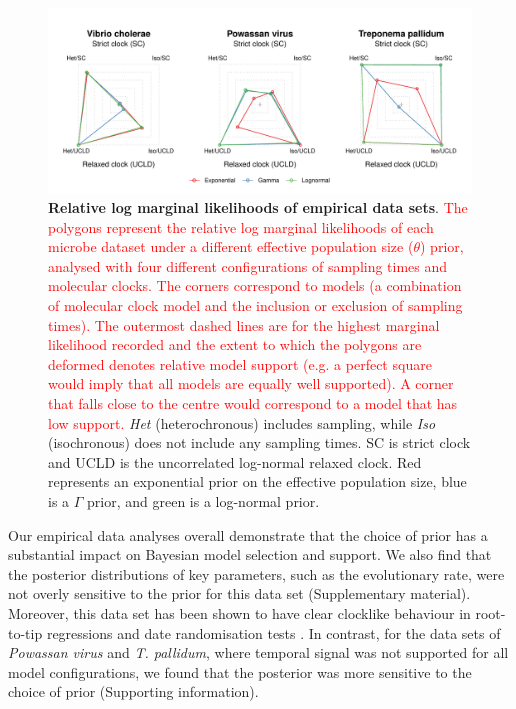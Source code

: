 \documentclass[10pt,letterpaper]{article}
\begin{document}
\begin{figure}
	\begin{center}
		\includegraphics[width=14cm]{sandbox_figures/polygon_plot.pdf}\newline
		\vspace{-0.5cm}
		\caption{\textbf{Relative log marginal likelihoods of empirical data sets}. \textcolor{red}{The polygons represent the relative log marginal likelihoods of each microbe dataset under a different effective population size ($\theta$) prior, analysed with four different configurations of sampling times and molecular clocks. The corners correspond to models (a combination of molecular clock model and the inclusion or exclusion of sampling times). The outermost dashed lines are for the highest marginal likelihood recorded and the extent to which the polygons are deformed denotes relative model support (e.g. a perfect square would imply that all models are equally well supported). A corner that falls close to the centre would correspond to a model that has low support.} \textit{Het} (heterochronous) includes sampling, while \textit{Iso} (isochronous) does not include any sampling times. SC is strict clock and UCLD is the uncorrelated log-normal relaxed clock. Red represents an exponential prior on the effective population size, blue is a $\Gamma$ prior, and green is a log-normal prior.}
		\label{figure:polygon_plots}
	\end{center}
\end{figure}

Our empirical data analyses overall demonstrate that the choice of prior has a substantial impact on Bayesian model selection and support. We also find that the posterior distributions of key parameters, such as the evolutionary rate, were not overly sensitive to the prior for this data set (Supplementary material). Moreover, this data set has been shown to have clear clocklike behaviour in root-to-tip regressions and date randomisation tests \cite{duchene2016genome}. In contrast, for the data sets of \textit{Powassan virus} and \textit{T. pallidum}, where temporal signal was not supported for all model configurations, we found that the posterior was more sensitive to the choice of prior (Supporting information).
\end{document}
